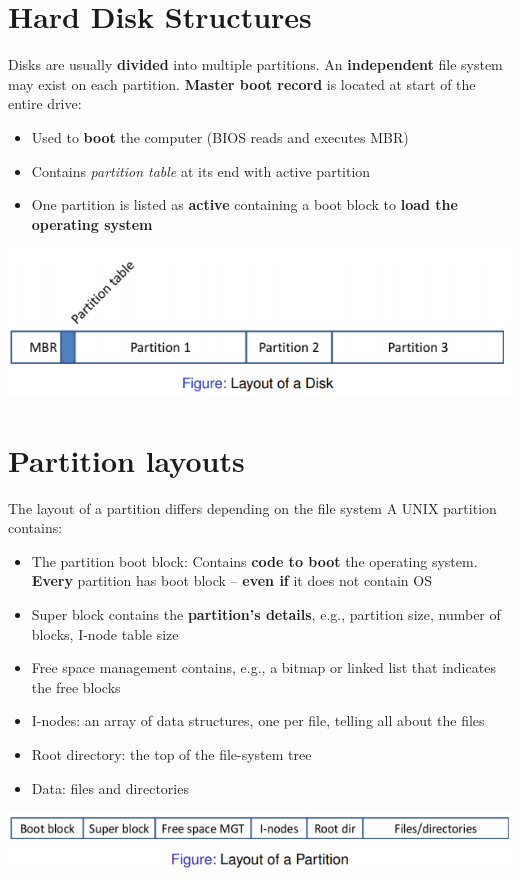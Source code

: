 \documentclass{article}
\begin{document}
\section{Hard Disk Structures}
\begin{flushleft}
Disks are usually \textbf{divided} into multiple partitions. An \textbf{independent} file system may exist on each partition. \textbf{Master boot record} is located at start of the entire drive:
\begin{itemize}
	\item Used to \textbf{boot} the computer (BIOS reads and executes MBR)
	\item Contains \textit{partition table} at its end with active partition
	\item One partition is listed as \textbf{active} containing a boot block to \textbf{load the operating system}
\end{itemize}
\end{flushleft}
\begin{center}
	\includegraphics[scale=0.4]{disk_partition.png}
\end{center}

\section{Partition layouts}
\begin{flushleft}
The layout of a partition differs depending on the file system A UNIX partition contains:
\begin{itemize}
	\item  The partition boot block: Contains \textbf{code to boot} the operating system. \textbf{Every} partition has boot block – \textbf{even if} it does not contain OS
	\item Super block contains the \textbf{partition’s details}, e.g., partition size, number of blocks, I-node table size
	\item Free space management contains, e.g., a bitmap or linked list that indicates the free blocks
	\item I-nodes: an array of data structures, one per file, telling all about the files
	\item Root directory: the top of the file-system tree
	\item Data: files and directories
\end{itemize}
\end{flushleft}
\begin{center}
	\includegraphics[scale=0.5]{partition_layout.png}
\end{center}
\end{document}
